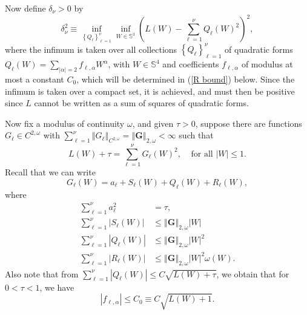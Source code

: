 \documentclass{amsart}
\theoremstyle{plain}
\numberwithin{equation}{section}
\begin{document}

Now define $\delta _{\nu }>0$ by%
\begin{equation}
\delta _{\nu }^{2}\equiv \inf_{\left\{ Q_{\ell }\right\} _{\ell =1}^{\nu
}}\inf_{W\in \mathbb{S}^{3}}\left( L\left( W\right) -\sum_{\ell =1}^{\nu
}Q_{\ell }\left( W\right) ^{2}\right) ^{2},  \label{def delta}
\end{equation}%
where the infimum is taken over all collections $\left\{ Q_{\ell }\right\}
_{\ell =1}^{\nu }$ of quadratic forms $Q_{\ell }\left( W\right)
=\sum_{\left\vert \alpha \right\vert =2}f_{\ell ,\alpha }W^{\alpha }$, with $%
W\in \mathbb{S}^{4}$ and coefficients $f_{\ell ,\alpha }$ of modulus at most
a constant $C_{0}$, which will be determined in (\ref{R bound}) below. Since
the infimum is taken over a compact set, it is achieved, and must then be
positive since $L$ cannot be written as a sum of squares of quadratic forms.

Now fix a modulus of continuity $\omega $, and given $\tau >0$, suppose
there are functions $G_{\ell }\in C^{2,\omega }$ with $\sum_{\ell =1}^{\nu
}\left\Vert G_{\ell }\right\Vert _{C^{2,\omega }}=\left\Vert \mathbf{G}%
\right\Vert _{2,\omega }<\infty $ such that%
\begin{equation}
L\left( W\right) +\tau =\sum_{\ell =1}^{\nu }G_{\ell }\left( W\right) ^{2},\
\ \ \ \ \text{for all }\left\vert W\right\vert \leq 1.  \label{sos tau}
\end{equation}%
Recall that we can write 
\begin{equation*}
G_{\ell }\left( W\right) =a_{\ell }+S_{\ell }\left( W\right) +Q_{\ell
}\left( W\right) +R_{\ell }\left( W\right) ,
\end{equation*}%
where 
\begin{align}
\sum_{\ell =1}^{\nu }a_{\ell }^{2}& =\tau ,  \label{terms_est} \\
\sum_{\ell =1}^{\nu }|S_{\ell }\left( W\right) |& \leq \left\Vert \mathbf{G}%
\right\Vert _{2,\omega }|W| \\
\sum_{\ell =1}^{\nu }|Q_{\ell }\left( W\right) |& \leq \left\Vert \mathbf{G}%
\right\Vert _{2,\omega }|W|^{2} \\
\sum_{\ell =1}^{\nu }|R_{\ell }\left( W\right) |& \leq \left\Vert \mathbf{G}%
\right\Vert _{2,\omega }|W|^{2}\omega (W).
\end{align}%
Also note that from $\sum_{\ell =1}^{\nu }\left\vert Q_{\ell }\left(
W\right) \right\vert \leq C\sqrt{L\left( W\right) +\tau }$, we obtain that
for $0<\tau <1$, we have 
\begin{equation}
\left\vert f_{\ell ,\alpha }\right\vert \leq C_{0}\equiv C\sqrt{L\left(
W\right) +1}.  \label{R bound}
\end{equation}
\end{document}
